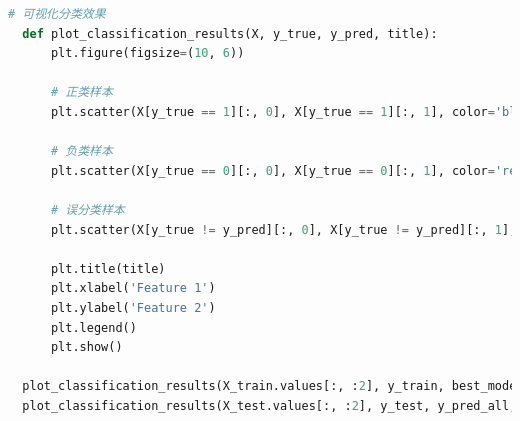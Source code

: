 \documentclass[12pt]{article}
\begin{document}
\begin{lstlisting}[language=python]
  # 可视化分类效果
  def plot_classification_results(X, y_true, y_pred, title):
      plt.figure(figsize=(10, 6))
      
      # 正类样本
      plt.scatter(X[y_true == 1][:, 0], X[y_true == 1][:, 1], color='blue', label='Positive Class (Original)')
      
      # 负类样本
      plt.scatter(X[y_true == 0][:, 0], X[y_true == 0][:, 1], color='red', label='Negative Class (Original)')
      
      # 误分类样本
      plt.scatter(X[y_true != y_pred][:, 0], X[y_true != y_pred][:, 1], color='yellow', edgecolor='black', label='Misclassified')
  
      plt.title(title)
      plt.xlabel('Feature 1')
      plt.ylabel('Feature 2')
      plt.legend()
      plt.show()
  
  plot_classification_results(X_train.values[:, :2], y_train, best_model.predict(X_train.values), 'Training Set Classification Results(sklearn)')
  plot_classification_results(X_test.values[:, :2], y_test, y_pred_all, 'Test Set Classification Results(sklearn)')   
  
\end{lstlisting}
\end{document}
